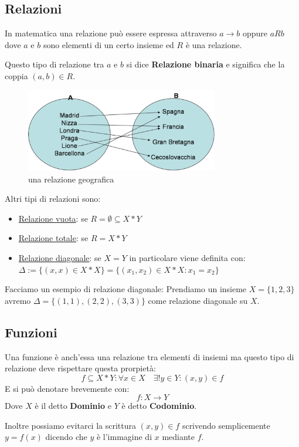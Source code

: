 \documentclass{article}
\begin{document}
\subsection{Relazioni}
In matematica una relazione può essere espressa attraverso $ a \to b$ oppure $ a R b $ dove $ a $ e $ b $ sono elementi di un certo insieme ed $ R $ è una relazione. \par
Questo tipo di relazione tra $ a $ e $ b $ si dice \textbf{Relazione binaria} e significa che la coppia $ (a,b) \in R $. \par

\begin{figure}[h]
        \centering
                \includegraphics[width=0.75\textwidth]{relazioni.png}
        \caption{una relazione geografica}\label{fig:esempio_relazione}
\end{figure}

Altri tipi di relazioni sono:
\begin{itemize}
        \item \underline{Relazione vuota}: se $ R = \emptyset \subseteq X*Y $ 
        \item \underline{Relazione totale}: se $ R = X*Y $ 
        \item \underline{Relazione diagonale}: se $ X=Y $ in particolare viene definita con: \newline $ \Delta := \{(x,x) \in X*X\} = \{(x_1,x_2) \in X*X : x_1 = x_2\} $  
\end{itemize}
Facciamo un esempio di relazione diagonale: \newline
Prendiamo un insieme $ X = \{1,2,3\} $ avremo $ \Delta = \{(1,1), (2,2),(3,3)\} $ come relazione diagonale su $ X $.


\subsection{Funzioni}
Una funzione è anch'essa una relazione tra elementi di insiemi ma questo tipo di relazione deve rispettare questa prorpietà:
\begin{equation}\label{eq:prop_funzione}
        f \subseteq X*Y : \forall x \in X \quad \exists! y \in Y : (x,y) \in f 
\end{equation}
E si può denotare brevemente con:
\begin{equation*}
        f : X \to Y
\end{equation*}
Dove $ X $ è il detto \textbf{Dominio} e $ Y $ è detto \textbf{Codominio}. \par  
Inoltre possiamo evitarci la scrittura $ (x,y) \in f $ scrivendo semplicemente $ y = f(x) $ dicendo che $ y $ è l'immagine di $ x $ mediante $ f $. \par   
\end{document}
